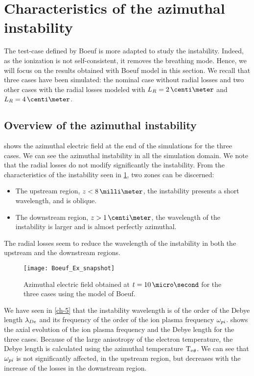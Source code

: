 
\section{Characteristics of the azimuthal instability}


The test-case defined by Boeuf is more adapted to  study the instability.
Indeed, as the ionization is not self-consistent, it removes the breathing mode.
Hence, we will focus on the results obtained with Boeuf model in this section.
We recall that three cases have been simulated\string: the nominal case without radial losses and two other cases with the radial losses modeled with $L_R=2\,\centi\meter$ and $L_R=4\,\centi\meter$.

\subsection{Overview of the azimuthal instability} \label{subsec-azi_insta_Ztheta}
 shows the azimuthal electric field at the end of the simulations for the three cases.
We can see the azimuthal instability in all the simulation domain.
We note that the radial losses do not modify significantly the instability.
From the characteristics of the instability seen in \cref{fig-snapshots}, two zones can be discerned\string:
\begin{itemize}
  \item The upstream region, $z < 8 \,\milli\meter$, the instability presents a short wavelength, and is oblique.
  \item The downstream region, $z > 1\,\centi\meter$, the wavelength of the instability is larger and is almost perfectly azimuthal.
\end{itemize}
The radial losses seem to reduce the wavelength of the instability in both the upstream and the downstream regions.


\begin{figure}[hbtp]
  \centering
  \texttt{[image: Boeuf\_Ex\_snapshot]}
  \caption{Azimuthal electric field obtained at $t=10 \,\micro\second$ for the three cases using the model of Boeuf.}
  \label{fig-snapshots}
\end{figure}

We have seen in \cref{ch-5} that the instability wavelength is of the order of the Debye length $\lambda_{De}$ and its frequency of the order of the ion plasma frequency $\omega_{pi}$.
 shows the axial evolution of the ion plasma frequency and the Debye length for the three cases.
Because of the large anisotropy of the electron temperature, the Debye length is calculated using the azimuthal temperature $\mathrm{T_e}_{\theta}$.
We can see that $\omega_{pi}$ is not significantly affected, in the upstream region, but decreases with the increase of the losses in the downstream region.

